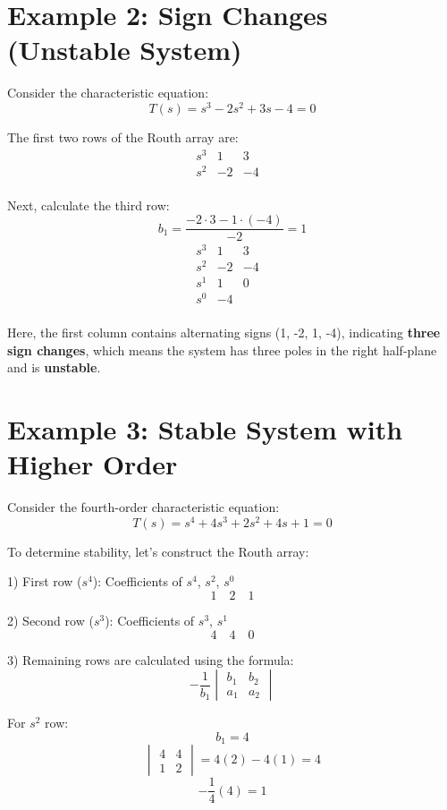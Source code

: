 \documentclass[a4paper,12pt]{article}
\begin{document}
\section{Example 2: Sign Changes (Unstable System)}

Consider the characteristic equation:
\begin{equation}
T(s) = s^3 - 2s^2 + 3s - 4 = 0
\end{equation}

The first two rows of the Routh array are:
\[
\begin{array}{c|ccc}
s^3 & 1 & 3 & \\
s^2 & -2 & -4 & \\
\end{array}
\]

Next, calculate the third row:
\[
b_1 = \frac{-2 \cdot 3 - 1 \cdot (-4)}{-2} = 1
\]
\[
\begin{array}{c|ccc}
s^3 & 1 & 3 & \\
s^2 & -2 & -4 & \\
s^1 & 1 & 0 & \\
s^0 & -4 & & \\
\end{array}
\]

Here, the first column contains alternating signs (1, -2, 1, -4), indicating \textbf{three sign changes}, which means the system has three poles in the right half-plane and is \textbf{unstable}.

\section{Example 3: Stable System with Higher Order}

Consider the fourth-order characteristic equation:
$$
T(s) = s^4 + 4s^3 + 2s^2 + 4s + 1 = 0
$$

To determine stability, let's construct the Routh array:

1) First row ($s^4$): Coefficients of $s^4$, $s^2$, $s^0$
$$
1 \quad 2 \quad 1
$$

2) Second row ($s^3$): Coefficients of $s^3$, $s^1$
$$
4 \quad 4 \quad 0
$$

3) Remaining rows are calculated using the formula:
$$
-\frac{1}{b_1}
\begin{vmatrix}
b_1 & b_2 \\
a_1 & a_2
\end{vmatrix}
$$

For $s^2$ row:
$$
b_1 = 4
$$
$$
\begin{vmatrix}
4 & 4 \\
1 & 2
\end{vmatrix} = 4(2) - 4(1) = 4
$$
$$
-\frac{1}{4}(4) = 1
$$
\end{document}
